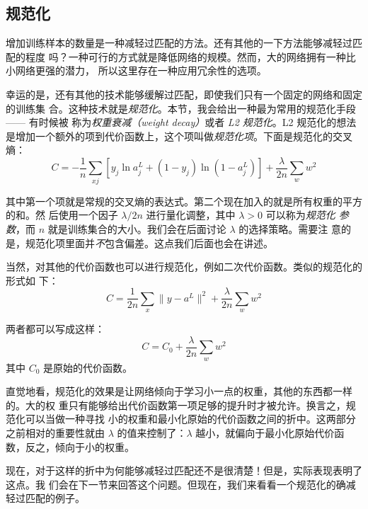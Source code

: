 \subsection{规范化}

增加训练样本的数量是一种减轻过匹配的方法。还有其他的一下方法能够减轻过匹配的程度
吗？一种可行的方式就是降低网络的规模。然而，大的网络拥有一种比小网络更强的潜力，
所以这里存在一种应用冗余性的选项。

幸运的是，还有其他的技术能够缓解过匹配，即使我们只有一个固定的网络和固定的训练集
合。这种技术就是\emph{规范化}。本节，我会给出一种最为常用的规范化手段 —— 有时候被
称为\emph{权重衰减（weight decay）}或者 \emph{L2 规范化}。L2 规范化的想法是增加一个额外的项到代价函数上，这个项叫做\emph{规范化项}。下面是规范化的交叉熵：
\begin{equation}
  C = -\frac{1}{n} \sum_{xj} \left[ y_j \ln a^L_j+(1-y_j) \ln
  (1-a^L_j)\right] + \frac{\lambda}{2n} \sum_w w^2
\label{eq:85}\tag{85}
\end{equation}

其中第一个项就是常规的交叉熵的表达式。第二个现在加入的就是所有权重的平方的和。然
后使用一个因子 $\lambda / 2n$ 进行量化调整，其中 $\lambda > 0$ 可以称为\emph{规范化
  参数}，而 $n$ 就是训练集合的大小。我们会在后面讨论 $\lambda$ 的选择策略。需要注
意的是，规范化项里面并\emph{不}包含偏差。这点我们后面也会在讲述。

当然，对其他的代价函数也可以进行规范化，例如二次代价函数。类似的规范化的形式如
下：
\begin{equation}
  C = \frac{1}{2n} \sum_x \|y-a^L\|^2 + \frac{\lambda}{2n} \sum_w w^2
  \label{eq:86}\tag{86}
\end{equation}

两者都可以写成这样：
\begin{equation}
  C = C_0 + \frac{\lambda}{2n} \sum_w w^2
  \label{eq:87}\tag{87}
\end{equation}
其中 $C_0$ 是原始的代价函数。

直觉地看，规范化的效果是让网络倾向于学习小一点的权重，其他的东西都一样的。大的权
重只有能够给出代价函数第一项足够的提升时才被允许。换言之，规范化可以当做一种寻找
小的权重和最小化原始的代价函数之间的折中。这两部分之前相对的重要性就由 $\lambda$
的值来控制了：$\lambda$ 越小，就偏向于最小化原始代价函数，反之，倾向于小的权重。

现在，对于这样的折中为何能够减轻过匹配还不是很清楚！但是，实际表现表明了这点。我
们会在下一节来回答这个问题。但现在，我们来看看一个规范化的确减轻过匹配的例子。

